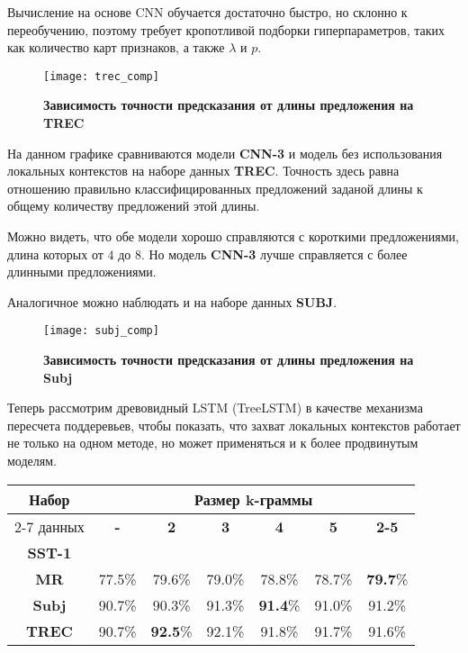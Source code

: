 Вычисление на основе CNN обучается достаточно быстро, но склонно к переобучению, поэтому требует кропотливой подборки гиперпараметров, таких как количество карт признаков, а также $\lambda$ и $p$.

\begin{figure}[H]
\texttt{[image: trec\_comp]}
\caption{\textbf{Зависимость точности предсказания от длины предложения на TREC}}
\label{fig:context_ex}
\end{figure}
На данном графике сравниваются модели \textbf{CNN-3} и модель без использования локальных контекстов на наборе данных \textbf{TREC}. Точность здесь равна отношению правильно классифицированных предложений заданой длины к общему количеству предложений этой длины. 

Можно видеть, что обе модели хорошо справляются с короткими предложениями, длина которых от $4$ до $8$.
Но модель \textbf{CNN-3} лучше справляется с более длинными предложениями.

Аналогичное можно наблюдать и на наборе данных \textbf{SUBJ}.

\begin{figure}[H]
\texttt{[image: subj\_comp]}
\caption{\textbf{Зависимость точности предсказания от длины предложения на Subj}}
\label{fig:context_ex}
\end{figure}

Теперь рассмотрим  древовидный LSTM (TreeLSTM) в качестве механизма пересчета поддеревьев, 
чтобы показать, что захват локальных контекстов работает не только на одном методе, 
но может применяться и к более продвинутым моделям.

\vspace{5mm}
\noindent \begin{minipage}{\linewidth}
 \label{tab:title} 
\begin{tabular}{|c|c|c|c|c|c|c|}
\hline
\multirow{2}{*}{Набор}   &                \multicolumn{6}{c|}{Размер k-граммы} \\ \cline{2-7} 
     данных              & \textbf{-} & \textbf{2} & \textbf{3} & \textbf{4} & \textbf{5} & \textbf{2-5} \\ \hline
\textbf{SST-1}           &            &            &            &            &            &        \\ \hline
\textbf{MR}              & 77.5\%     &  79.6\%    & 79.0\%     & 78.8\%     & 78.7\%     & \textbf{79.7}\% \\\hline
\textbf{Subj}            & 90.7\%     &  90.3\%    & 91.3\%     & \textbf{91.4}\%     & 91.0\%     &  91.2\% \\\hline
\textbf{TREC}            & 90.7\%     &  \textbf{92.5}\%    & 92.1\%     & 91.8\%     & 91.7\%     &  91.6\% \\\hline
\end{tabular}
\end{minipage}
\vspace{5mm}

